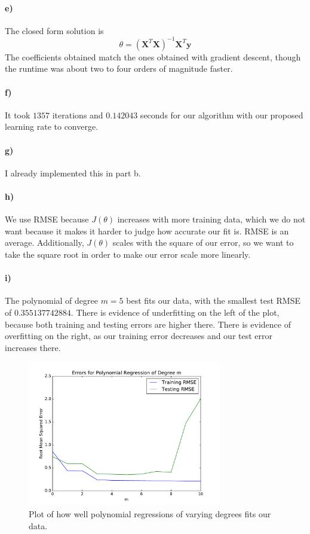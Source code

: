\documentclass[12pt]{article}
\begin{document}
\paragraph{e)}

The closed form solution is
\[\theta=\left(\mathbf{X}^T\mathbf{X}\right)^{-1}\mathbf{X}^T\mathbf{y}\]
The coefficients obtained match the ones obtained with gradient descent, though the runtime was about two to four orders of magnitude
faster.

\paragraph{f)}

It took \(1357\) iterations and \(0.142043\) seconds for our algorithm with our proposed learning rate to converge.

\paragraph{g)}

I already implemented this in part b.

\paragraph{h)}

We use RMSE because \(J(\theta)\) increases with more training data, which we do not want because it makes it harder to judge how accurate our
fit is. RMSE is an average. Additionally, \(J(\theta)\) scales with the square of our error, so we want to take the square root in order to make
our error scale more linearly.

\paragraph{i)}

The polynomial of degree \(m=5\) best fits our data, with the smallest test RMSE of \(0.355137742884\). There is evidence of underfitting
on the left of the plot, because both training and testing errors are higher there. There is evidence of overfitting on the right, as our
training error decreases and our test error increases there.

\begin{figure}[H]
        \begin{center}
                \includegraphics[height=2.5in]{polynomialRegression}
                \caption{Plot of how well polynomial regressions of varying degrees fits our data.}
        \end{center}
\end{figure}
\end{document}
